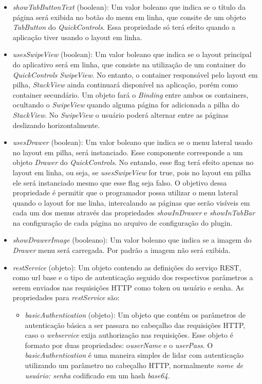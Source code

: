 \begin{itemize}
	\item \textit{showTabButtonText} (boolean): Um valor boleano que indica se o título da página será exibida no botão do menu em linha, que consite de um objeto \textit{TabButton} do \textit{QuickControls}. Essa propriedade só terá efeito quando a aplicação tiver usando o layout em linha.

	\item \textit{usesSwipeView} (boolean): Um valor boleano que indica se o layout principal do aplicativo será em linha, que consiste na utilização de um container do \textit{QuickControls} \textit{SwipeView}. No entanto, o container responsável pelo layout em pilha, \textit{StackView} ainda continuará disponível na aplicação, porém como container secundário. Um objeto fará o \textit{Binding} entre ambos os containers, ocultando o \textit{SwipeView} quando alguma página for adicionada a pilha do \textit{StackView}. No \textit{SwipeView} o usuário poderá alternar entre as páginas deslizando horizontalmente.

	\item \textit{usesDrawer} (boolean): Um valor boleano que indica se o menu lateral usado no layout em pilha, será instanciado. Esse componente corresponde a um objeto \textit{Drawer} do \textit{QuickControls}. No entando, esse flag terá efeito apenas no layout em linha, ou seja, se \textit{usesSwipeView} for true, pois no layout em pilha ele será instanciado mesmo que esse flag seja falso. O objetivo dessa propriedade é permitir que o programador possa utilizar o menu lateral quando o layout for me linha, intercalando as páginas que serão visíveis em cada um dos menus através das propriedades \textit{showInDrawer} e \textit{showInTabBar} na configuração de cada página no arquivo de configuração do plugin.

	\item \textit{showDrawerImage} (booleano): Um valor boleano que indica se a imagem do \textit{Drawer} menu será carregada. Por padrão a imagem não será exibida.

	\item \textit{restService} (objeto): Um objeto contendo as definições do serviço REST, como url base e o tipo de autenticação seguido dos respectivos parâmetros a serem enviados nas requisições HTTP como token ou usuário e senha. As propriedades para \textit{restService} são: 

	\begin{itemize}
		\item \textit{basicAuthentication} (objeto): Um objeto que contém os parâmetros de autenticação básica a ser passara no cabeçalho das requisições HTTP, caso o \textit{webservice} exija authorização nas requisições. Esse objeto é formato por duas propriedades: o\textit{userName} e o \textit{userPass}. O \textit{basicAuthentication} é uma maneira simples de lidar com autenticação utilizando um parâmetro no cabeçalho HTTP, normalmente \textit{nome de usuário: senha} codificado em um hash \textit{base64}.


\end{itemize}
\end{itemize}
